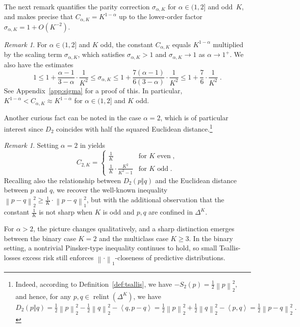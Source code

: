 \documentclass[11pt,oneside,a4paper]{article}
\newcommand{\lrb}[1]{\left(#1\right)}
\newcommand{\lno}[1]{\left\lVert#1\right\rVert}
\newcommand{\lan}[1]{\left\langle#1\right\rangle}
\theoremstyle{plain}
\theoremstyle{definition}
\theoremstyle{remark}
\newtheorem{remark}[theorem]{Remark}
\newcommand{\simplex}[1]{\Delta^{#1}}
\DeclareMathOperator*{\relint}{relint}
\begin{document}
The next remark quantifies the parity correction $\sigma_{\alpha,K}$ for $\alpha\in(1,2]$ and odd~$K$, and makes precise that $C_{\alpha,K}=K^{1-\alpha}$ up to the lower-order factor $\sigma_{\alpha,K}=1+O(K^{-2})$.
\begin{remark}
\label{rem:sigma}
For $\alpha \in (1,2]$ and $K$ odd, the constant $C_{\alpha, K}$ equals $K^{1-\alpha}$ multiplied by the scaling term $\sigma_{\alpha, K}$, which satisfies $\sigma_{\alpha, K} > 1$ and $\sigma_{\alpha, K} \to 1$ as $\alpha \to 1^+$. We also have the estimates
\[
    1 \le 1 + \frac{\alpha - 1}{3- \alpha} 
        \cdot\frac{1}{K^2} 
\le
    \sigma_{\alpha, K}
\le
    1 + \frac{7(\alpha - 1)}{6(3- \alpha)} 
        \cdot\frac{1}{K^2}
\le
    1 + \frac{7}{6} \cdot
        \frac{1}{K^2}\;.
\]
See Appendix~\ref{app:sigma} for a proof of this. In particular, $K^{1 - \alpha}< C_{\alpha, K} \approx K^{1 - \alpha}$ for $\alpha \in (1,2]$ and $K$ odd.
\end{remark}
Another curious fact can be noted in the case $\alpha = 2$, which is of particular interest since $D_2$ coincides with half the squared Euclidean distance.\footnote{
Indeed, according to Definition~\ref{def:tsallis}, we have
$
    -S_2(p)
=
    \frac{1}{2}\lno{p}_2^2,
$
and hence, for any $p,q \in \relint\lrb{\simplex{K}}$, we have 
$
    D_2(p\Vert q)
=
    \frac{1}{2}\lno{p}_2^2-\frac{1}{2}\lno{q}_2^2 - \lan{q,p-q}
=
    \frac{1}{2}\lno{p}_2^2 +\frac{1}{2}\lno{q}_2^2 - \lan{p,q}
=
    \frac{1}{2}\lno{p-q}_2^2\;.
$
}
\begin{remark}
\label{r:euclidean}
Setting $\alpha = 2$ in  yields
\[
    C_{2, K}
=    
        \begin{cases}
            \frac{1}{K}
        &
            \text{for $K$ even}\;,
        \\
            \frac{1}{K} \cdot
    \frac{K^2}{K^2-1}
        &
            \text{for $K$ odd}\;.
        \end{cases}
\]  
Recalling also the relationship between $D_2(p\Vert q)$ and the Euclidean distance
 between $p$ and $q$,
we recover the well-known inequality $\lno{p-q}_2^2 \ge \frac{1}{K} \cdot \lno{p-q}_1^2$, but with the additional observation that the constant $\frac{1}{K}$ is not sharp when $K$ is odd and $p, q$ are confined in $\simplex{K}$.
\end{remark}
For $\alpha>2$, the picture changes qualitatively, and a sharp distinction emerges between the binary case $K=2$ and the multiclass case $K\ge 3$.
In the binary setting, a nontrivial Pinsker-type inequality continues to hold, so small Tsallis-losses excess risk still enforces $\lno{\cdot}_1$-closeness of predictive distributions.
\end{document}
